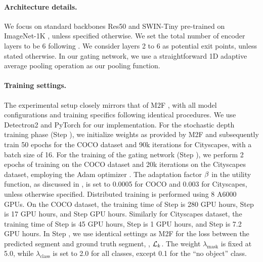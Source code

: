 \paragraph{Architecture details.} We focus on standard backbones Res50 \cite{he2016deep} and SWIN-Tiny \cite{liu2021swin} pre-trained on ImageNet-1K \cite{deng2009imagenet}, unless specified otherwise. We set the total number of encoder layers to be 6 following \cite{cheng2021mask2former}. We consider layers 2 to 6 as potential exit points, unless stated otherwise. In our gating network, we use a straightforward 1D adaptive average pooling operation as our pooling function. 

\paragraph{Training settings.} The experimental setup closely mirrors that of M2F \cite{cheng2021mask2former}, with all model configurations and training specifics following identical procedures. 
We use Detectron2 \cite{wu2019detectron2} and PyTorch\cite{PyTorch} for our implementation.
For the stochastic depth training phase (Step \stepA), we initialize weights as provided by M2F and subsequently train 50 epochs for the COCO dataset and 90k iterations for Cityscapes, with a batch size of 16.
For the training of the gating network (Step \stepC), we perform 2 epochs of training on the COCO dataset and 20k iterations on the Cityscapes dataset, employing the Adam optimizer \cite{kingma2017adam}. The adaptation factor $\beta$ in the utility function, as discussed in , is set to 0.0005 for COCO and 0.003 for Cityscapes, unless otherwise specified. Distributed training is performed using 8 A6000 GPUs. On the COCO dataset, the training time of Step \stepA is 280 GPU hours, Step \stepB is 17 GPU hours, and Step  GPU hours. Similarly for Cityscapes dataset, the training time of Step \stepA is 45 GPU hours, Step \stepB is 1 GPU hours, and Step \stepC is 7.2 GPU hours. In Step \stepA, we use identical settings as M2F for the loss between the predicted segment and ground truth segment, \ie, $\mathcal{L}_k$. The weight $\lambda_{\text{mask}}$ is fixed at 5.0, while $\lambda_{\text{class}}$ is set to 2.0 for all classes, except 0.1 for the ``no object'' class. 

